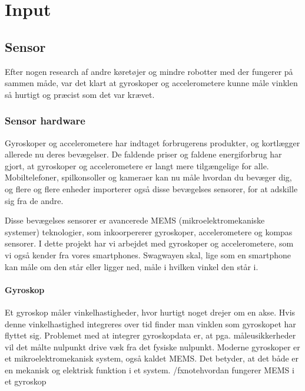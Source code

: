\documentclass[a4paper,oneside,article,danish,table]{memoir}
\begin{document}
\chapter{Input}
\section{Sensor}
Efter nogen research af andre køretøjer og mindre robotter med der fungerer på sammen måde, var det klart at gyroskoper og accelerometere kunne måle vinklen så hurtigt og præcist som det var krævet.
\subsection{Sensor hardware}
Gyroskoper og accelerometere har indtaget forbrugerens produkter, og kortlægger allerede nu deres bevægelser. De faldende priser og faldene energiforbrug har gjort, at gyroskoper og accelerometere er langt mere tilgængelige for alle. Mobiltelefoner, spilkonsoller og kameraer kan nu måle hvordan du bevæger dig, og flere og flere enheder importerer også disse bevægelses sensorer, for at adskille sig fra de andre.

Disse bevægelses sensorer er avancerede MEMS (mikroelektromekaniske systemer) teknologier, som inkoorpererer gyroskoper, accelerometere og kompas sensorer. %
I dette projekt har vi arbejdet med gyroskoper og accelerometere, som vi også kender fra vores smartphones. Swagwayen skal, lige som en smartphone kan måle om den står eller ligger ned, måle i hvilken vinkel den står i.   

\subsubsection{Gyroskop}
Et gyroskop måler vinkelhastigheder, hvor hurtigt noget drejer om en akse. Hvis denne vinkelhastighed integreres over tid finder man vinklen som gyroskopet har flyttet sig. Problemet med at integrer gyroskopdata er, at pga. måleusikkerheder vil det målte nulpunkt drive væk fra det fysiske nulpunkt. Moderne gyroskoper er et mikroelektromekanisk system, også kaldet MEMS. Det betyder, at det både er en mekanisk og elektrisk funktion i et system. /fxnote{hvordan fungerer MEMS i et gyroskop}
\end{document}
